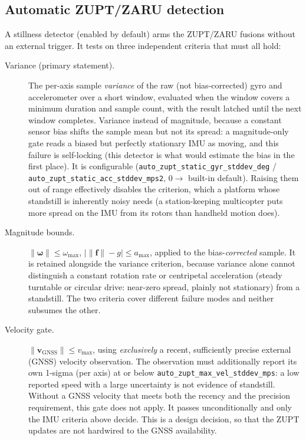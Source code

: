 \documentclass[11pt,a4paper]{article}
\newcommand{\vect}[1]{\bm{#1}}
\newcommand{\code}[1]{\texttt{#1}}
\begin{document}
\subsection{Automatic ZUPT/ZARU detection}
\label{sec:autozupt}

A stillness detector (enabled by default) arms the ZUPT/ZARU fusions
without an external trigger. It tests on three independent criteria that
must all hold:

\begin{description}
  \item[Variance (primary statement).] The per-axis sample
    \emph{variance} of the raw (not bias-corrected) gyro and
    accelerometer over a short window, evaluated when the
    window covers a minimum duration and sample count, with the
    result latched until the next window completes. Variance instead of
    magnitude, because a constant sensor bias shifts the sample
    mean but not its spread: a magnitude-only gate reads a biased but
    perfectly stationary IMU as moving, and this failure is
    self-locking (this detector is what would estimate the bias in
    the first place). It is configurable
    (\code{auto\_\allowbreak{}zupt\_\allowbreak{}static\_\allowbreak{}gyr\_\allowbreak{}stddev\_\allowbreak{}deg} /
    \code{auto\_\allowbreak{}zupt\_\allowbreak{}static\_\allowbreak{}acc\_\allowbreak{}stddev\_\allowbreak{}mps2}, $0 \to$ built-in
    default). Raising them out of range effectively disables the
    criterion, which a platform whose standstill is inherently noisy
    needs (a station-keeping multicopter puts more spread on the IMU
    from its rotors than handheld motion does).
  \item[Magnitude bounds.] $\|\vect{\omega}\| \le \omega_{\max}$,
    $\big|\|\vect{f}\| - g\big| \le a_{\max}$, applied to the
    bias-\emph{corrected} sample. It is retained alongside the variance
    criterion, because variance alone cannot distinguish a constant
    rotation rate or centripetal acceleration (steady turntable or
    circular drive: near-zero spread, plainly not stationary) from a
    standstill. The two criteria cover different failure modes and
    neither subsumes the other.
  \item[Velocity gate.] $\|\vect{v}_{\text{GNSS}}\| \le v_{\max}$,
    using \emph{exclusively} a recent, sufficiently precise external
    (GNSS) velocity observation. The observation must additionally report its own 1-sigma
    (per axis) at or below \code{auto\_\allowbreak{}zupt\_\allowbreak{}max\_\allowbreak{}vel\_\allowbreak{}stddev\_\allowbreak{}mps}: a
    low reported speed with a large uncertainty is not evidence of
    standstill. Without a GNSS velocity that meets both the recency and the
    precision requirement, this gate does not apply. It passes
    unconditionally and only the IMU criteria above decide. This is
    a design decision, so that the ZUPT updates are not hardwired
    to the GNSS availability.
\end{description}
\end{document}
